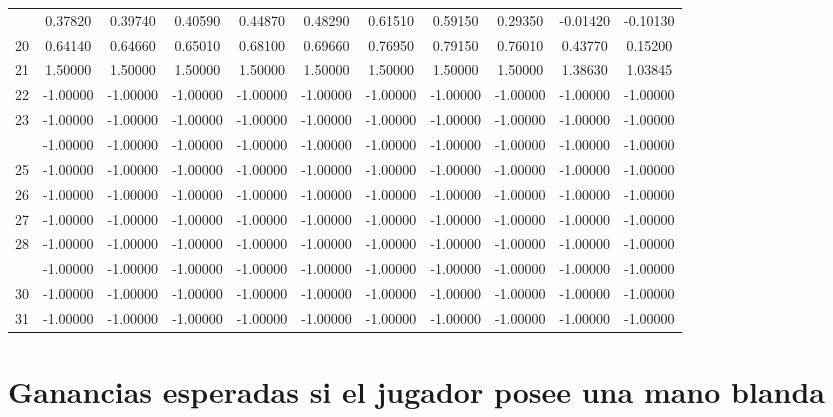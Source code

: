 \documentclass[12pt,a4paper,]{book}
\numberwithin{dummy}{section}
\theoremstyle{ocrenumbox}
\theoremstyle{blacknumex}
\theoremstyle{blacknumbox}
\theoremstyle{ocrenum}
\theoremstyle{ocrenum}
\begin{document}
\begin{longtable}[t]{lcccccccccc}
\addlinespace
19 & 0.37820 & 0.39740 & 0.40590 & 0.44870 & 0.48290 & 0.61510 & 0.59150 & 0.29350 & -0.01420 & -0.10130\\
20 & 0.64140 & 0.64660 & 0.65010 & 0.68100 & 0.69660 & 0.76950 & 0.79150 & 0.76010 & 0.43770 & 0.15200\\
21 & 1.50000 & 1.50000 & 1.50000 & 1.50000 & 1.50000 & 1.50000 & 1.50000 & 1.50000 & 1.38630 & 1.03845\\
22 & -1.00000 & -1.00000 & -1.00000 & -1.00000 & -1.00000 & -1.00000 & -1.00000 & -1.00000 & -1.00000 & -1.00000\\
23 & -1.00000 & -1.00000 & -1.00000 & -1.00000 & -1.00000 & -1.00000 & -1.00000 & -1.00000 & -1.00000 & -1.00000\\
\addlinespace
24 & -1.00000 & -1.00000 & -1.00000 & -1.00000 & -1.00000 & -1.00000 & -1.00000 & -1.00000 & -1.00000 & -1.00000\\
25 & -1.00000 & -1.00000 & -1.00000 & -1.00000 & -1.00000 & -1.00000 & -1.00000 & -1.00000 & -1.00000 & -1.00000\\
26 & -1.00000 & -1.00000 & -1.00000 & -1.00000 & -1.00000 & -1.00000 & -1.00000 & -1.00000 & -1.00000 & -1.00000\\
27 & -1.00000 & -1.00000 & -1.00000 & -1.00000 & -1.00000 & -1.00000 & -1.00000 & -1.00000 & -1.00000 & -1.00000\\
28 & -1.00000 & -1.00000 & -1.00000 & -1.00000 & -1.00000 & -1.00000 & -1.00000 & -1.00000 & -1.00000 & -1.00000\\
\addlinespace
29 & -1.00000 & -1.00000 & -1.00000 & -1.00000 & -1.00000 & -1.00000 & -1.00000 & -1.00000 & -1.00000 & -1.00000\\
30 & -1.00000 & -1.00000 & -1.00000 & -1.00000 & -1.00000 & -1.00000 & -1.00000 & -1.00000 & -1.00000 & -1.00000\\
31 & -1.00000 & -1.00000 & -1.00000 & -1.00000 & -1.00000 & -1.00000 & -1.00000 & -1.00000 & -1.00000 & -1.00000\\
\bottomrule
\end{longtable}
\endgroup{}

\hypertarget{ganancias-esperadas-si-el-jugador-posee-una-mano-blanda}{%
\section{Ganancias esperadas si el jugador posee una mano
blanda}\label{ganancias-esperadas-si-el-jugador-posee-una-mano-blanda}}
\end{document}
